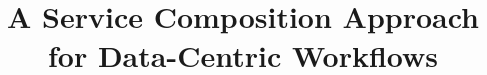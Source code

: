 \documentclass{acm_proc_article-sp}
\begin{document}

\title{A Service Composition Approach for Data-Centric Workflows}

%
%
%
%
%
\end{document}
